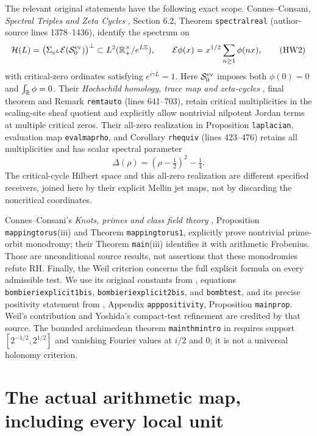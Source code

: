 \documentclass[11pt,a4paper]{article}
\theoremstyle{definition}\newtheorem{definition}[theorem]{Definition}
\newcommand{\Z}{\mathbb Z}\newcommand{\Q}{\mathbb Q}
\begin{document}
The relevant original statements have the following exact scope.
Connes--Consani, \emph{Spectral Triples and Zeta Cycles}
\cite{HW-CCcycles}, Section 6.2, Theorem \texttt{spectralreal}
(author-source lines 1378--1436), identify the spectrum on
\[
 \mathcal H(L)=
 \bigl(\Sigma_{e^L}\mathcal E(\mathcal S^{\rm ev}_0)\bigr)^\perp
 \subset L^2(\R_+^\times/e^{L\Z}),\qquad
 \mathcal E\phi(x)=x^{1/2}\sum_{n\ge1}\phi(nx),
 \tag{HW2}
\]
with critical-zero ordinates satisfying \(e^{i\gamma L}=1\).
Here \(\mathcal S^{\rm ev}_0\) imposes both
\(\phi(0)=0\) and \(\int_\mathbb R\phi=0\).
Their \emph{Hochschild homology, trace map and zeta-cycles}
\cite{HW-CCHH}, final theorem and Remark \texttt{remtauto}
(lines 641--703), retain critical multiplicities in the
scaling-site sheaf quotient and explicitly allow nontrivial
nilpotent Jordan terms at multiple critical zeros.
Their all-zero realization in Proposition \texttt{laplacian},
evaluation map \texttt{evalmaprho}, and Corollary
\texttt{rhequiv} (lines 423--476) retains all multiplicities and
has scalar spectral parameter
\[
 \Delta(\rho)=(\rho-\tfrac12)^2-\tfrac14.
 \tag{HW3}
\]
The critical-cycle Hilbert space and this all-zero realization are
different specified receivers, joined here by their explicit Mellin
jet maps, not by discarding the noncritical coordinates.

Connes--Consani's \emph{Knots, primes and class field theory}
\cite{HW-CCclass}, Proposition \texttt{mappingtorus}(iii) and
Theorem \texttt{mappingtorus1}, explicitly prove nontrivial
prime-orbit monodromy; their Theorem \texttt{main}(iii) identifies
it with arithmetic Frobenius. Those are unconditional source
results, not assertions that these monodromies refute RH.
Finally, the Weil criterion concerns the full explicit formula
on every admissible test. We use its original constants from
\cite{HW-CCcycles}, equations \texttt{bombieriexplicit1bis},
\texttt{bombieriexplicit2bis}, and \texttt{bombtest}, and its
precise positivity statement from \cite{HW-CCWeil},
Appendix \texttt{apppositivity}, Proposition \texttt{mainprop}.
Weil's contribution and Yoshida's compact-test refinement are
credited by that source. The bounded archimedean theorem
\texttt{mainthmintro} in \cite{HW-CCWeil} requires support
\([2^{-1/2},2^{1/2}]\) and vanishing Fourier values at \(i/2\)
and \(0\); it is not a universal holonomy criterion.

\section{The actual arithmetic map, including every local unit}
\end{document}

